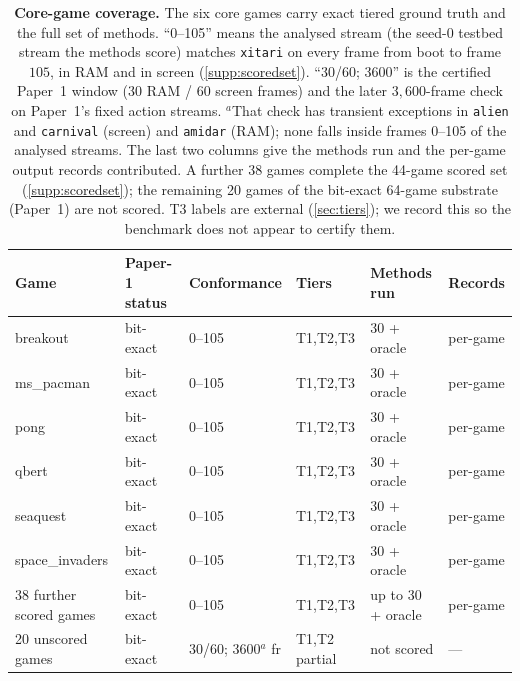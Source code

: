 \begin{table}[t]
\centering
\caption{\textbf{Core-game coverage.} The six core games carry exact tiered ground truth and
the full set of methods. ``0--105'' means the analysed stream (the seed-0 testbed stream the
methods score) matches \texttt{xitari} on every frame from boot to frame $105$, in RAM and in
screen (\Sectionname\ref{supp:scoredset}). ``30/60; 3600'' is the certified Paper~1 window (30
RAM / 60 screen frames) and the later $3{,}600$-frame check on Paper~1's fixed action streams.
$^{a}$That check has transient exceptions in \texttt{alien} and \texttt{carnival} (screen) and
\texttt{amidar} (RAM); none falls inside frames 0--105 of the analysed streams. The
last two columns give the methods run and the per-game output records contributed. A further
38 games complete the 44-game scored set (\Sectionname\ref{supp:scoredset}); the remaining 20
games of the bit-exact 64-game substrate (Paper~1) are not scored. T3 labels are
external (\Sectionname\ref{sec:tiers}); we record this so the benchmark does not appear to certify them.}
\label{supp:tab:coverage}
\footnotesize
\setlength{\tabcolsep}{4pt}
\begin{tabular}{@{}p{2.4cm}p{1.9cm}p{1.5cm}p{1.7cm}p{1.5cm}p{1.4cm}@{}}
\toprule
Game & Paper-1 status & Conformance & Tiers & Methods run & Records \\
\midrule
breakout & bit-exact & 0--105 & T1,T2,T3 & 30 + oracle & per-game \\
ms\_pacman & bit-exact & 0--105 & T1,T2,T3 & 30 + oracle & per-game \\
pong & bit-exact & 0--105 & T1,T2,T3 & 30 + oracle & per-game \\
qbert & bit-exact & 0--105 & T1,T2,T3 & 30 + oracle & per-game \\
seaquest & bit-exact & 0--105 & T1,T2,T3 & 30 + oracle & per-game \\
space\_invaders & bit-exact & 0--105 & T1,T2,T3 & 30 + oracle & per-game \\
\midrule
38 further scored games & bit-exact & 0--105 & T1,T2,T3 & up to 30 + oracle & per-game \\
20 unscored games & bit-exact & 30/60; 3600$^{a}$ fr & T1,T2 partial & not scored & --- \\
\bottomrule
\end{tabular}
\end{table}

